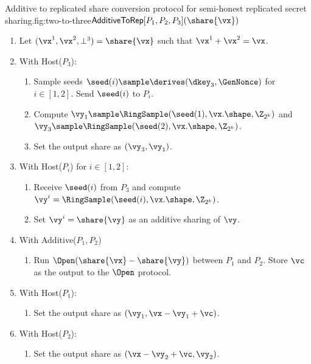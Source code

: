 
\begin{Boxfig}{Additive to replicated share conversion protocol for semi-honest
replicated secret sharing.}{fig:two-to-three}{$\mathsf{AdditiveToRep}[P_1, P_2, P_3](\share{\vx})$}
\begin{enumerate}
\item Let $(\vx^1, \vx^2, \bot^3) = \share{\vx}$ such that $\vx^1 + \vx^2 = \vx$.
\item With Host($P_3$):
\begin{enumerate}
  \item Sample seeds $\seed(i) \sample \derives(\dkey_3, \GenNonce)$ for $i \in [1, 2]$. Send $\seed(i)$ to $P_i$.
  \item Compute $\vy_1 \sample \RingSample(\seed(1), \vx.\shape, \Z_{2^k})$
  and $\vy_3 \sample \RingSample(\seed(2), \vx.\shape, \Z_{2^k})$.
  \item Set
  the output share as $(\vy_3, \vy_1)$.
\end{enumerate}

\item With Host($P_i$) for $i \in [1,2]$:
\begin{enumerate}
   \item Receive $\seed(i)$ from $P_3$ and compute $\vy^i = \RingSample(\seed(i), \vx.\shape, \Z_{2^k})$.
  \item Set $\vy^i = \share{\vy}$ as an additive sharing of $\vy$.
\end{enumerate}
\item With Additive($P_1, P_2$)
\begin{enumerate}
  \item Run $\Open(\share{\vx} - \share{\vy})$ between $P_1$ and $P_2$. Store $\vc$ as the output
to the $\Open$ protocol.
\end{enumerate}
\item With Host($P_1$):
\begin{enumerate}
  \item Set the output share as $(\vy_1, \vx - \vy_1 + \vc)$.
\end{enumerate}
\item With Host($P_2$):
\begin{enumerate}
  \item Set the output share as $(\vx - \vy_2 + \vc, \vy_2)$.
\end{enumerate}
\end{enumerate}
\end{Boxfig}

